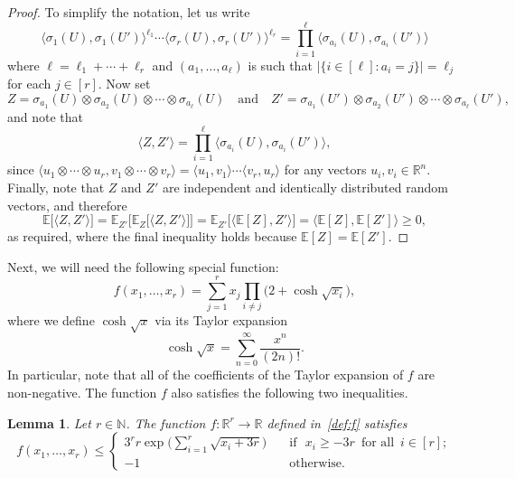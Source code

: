 \documentclass[12pt,reqno]{amsart}
\newtheorem{lemma}[theorem]{Lemma}
\theoremstyle{definition}
\theoremstyle{remark}
\newcommand\N{\mathbb{N}}
\newcommand\R{\mathbb{R}}
\newcommand\Ex{\mathbb{E}}
\renewcommand{\le}{\leqslant}
\renewcommand{\ge}{\geqslant}
\renewcommand{\to}{\rightarrow}
\def\R{\mathbb{R}}
\def\N{\mathbb{N}}
\begin{document}
\begin{proof}
To simplify the notation, let us write 
$$\big\langle \sigma_1(U),\sigma_1(U') \big\rangle^{\ell_1} \cdots \big\langle \sigma_r(U), \sigma_r(U') \big\rangle^{\ell_r} = \prod_{i = 1}^\ell \big\langle \sigma_{a_i}(U), \sigma_{a_i}(U') \big\rangle $$
where $\ell = \ell_1 + \cdots + \ell_r$ and $(a_1,\dots,a_\ell)$ is such that $\big| \big\{ i \in [\ell] : a_i = j \big\} \big| = \ell_j$ for each $j \in [r]$. Now set
$$Z = \sigma_{a_1}(U) \otimes \sigma_{a_2}(U) \otimes \cdots \otimes \sigma_{a_\ell}(U) \quad \text{and} \quad Z' = \sigma_{a_1}(U') \otimes \sigma_{a_2}(U') \otimes \cdots \otimes \sigma_{a_\ell}(U'),$$ 
and note that 
$$\big\langle Z, Z' \big\rangle = \prod_{i = 1}^\ell \big\langle \sigma_{a_i}(U), \sigma_{a_i}(U') \big\rangle,$$ 
since $\langle u_1 \otimes \cdots \otimes u_r, v_1 \otimes \cdots \otimes v_r \rangle = \langle u_1, v_1 \rangle  \cdots \langle v_r , u_r \rangle $ for any vectors $u_i,v_i \in \R^n$. Finally, note that $Z$ and $Z'$ are independent and identically distributed random vectors, and therefore
$$\Ex \big[ \langle Z, Z' \rangle \big] = \Ex_{Z'} \big[ \Ex_Z \big[ \langle Z, Z' \rangle \big] \big] = 
\Ex_{Z'} \big[ \big\langle \Ex[Z], Z' \big\rangle \big] = \big\langle \Ex[Z], \Ex[Z'] \big\rangle \ge 0,$$ 
as required, where the final inequality holds because $\Ex[Z] = \Ex[Z']$. 
\end{proof}

Next, we will need the following special function: 
\begin{equation}\label{def:f}
f(x_1,\dots,x_r) = \sum_{j = 1}^r x_j \prod_{i \ne j} \big( 2 + \cosh\sqrt{x_i} \big),
\end{equation}
where we define $\cosh \sqrt{x}$ via its Taylor expansion
$$\cosh\sqrt{x} = \sum_{n = 0}^\infty \frac{x^n}{(2n)!}.$$ 
In particular, note that all of the coefficients of the Taylor expansion of $f$ are non-negative. The function $f$ also satisfies the following two inequalities. 

\begin{lemma}\label{lem:special:function}
Let $r \in \N$. The function $f \colon \R^r \to \R$ defined in~\eqref{def:f} satisfies
$$
f(x_1,\dots,x_r) \le \left\{\begin{array}{cl}
3^r r \exp\bigg( \displaystyle\sum_{i = 1}^r \sqrt{ x_i + 3r } \bigg) \quad & \text{if } \,\, x_i \ge - 3r \,\text{ for all }\, i \in [r];\\[+3ex]
-1 & \text{otherwise.} 
\end{array} \right.
$$
\end{lemma}
\end{document}
